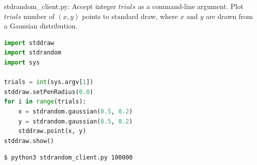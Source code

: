 \documentclass[8pt,a4paper,compress]{beamer}
\begin{document}
\begin{frame}[fragile]
\pause

\begin{framed}
\tiny stdrandom\_client.py: Accept integer $trials$ as a command-line argument. Plot $trials$ number of $(x, y)$ points to standard draw, where $x$ and $y$ are drawn from a Gaussian distribution.
\end{framed}

\begin{lstlisting}[language=Python]
import stddraw
import stdrandom
import sys

trials = int(sys.argv[1])
stddraw.setPenRadius(0.0)
for i in range(trials):
    x = stdrandom.gaussian(0.5, 0.2)
    y = stdrandom.gaussian(0.5, 0.2)
    stddraw.point(x, y)
stddraw.show()
\end{lstlisting}

\pause

\begin{minipage}{160pt}
\begin{lstlisting}[language={}]
$ python3 stdrandom_client.py 100000
\end{lstlisting}
\end{minipage}%
\begin{minipage}{140pt}
\hfill {}
\end{minipage}
\end{frame}
\end{document}
